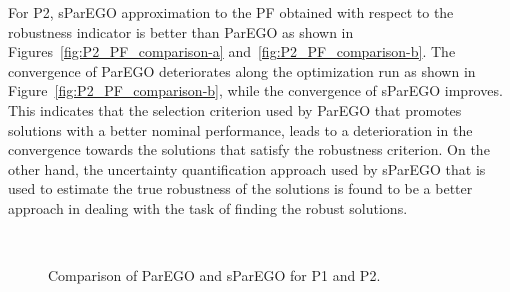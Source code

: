 \documentclass{llncs}
\begin{document}
For P2, sParEGO approximation to the PF obtained with respect to the robustness indicator is better than ParEGO as shown in Figures~\ref{fig:P2_PF_comparison-a} and~\ref{fig:P2_PF_comparison-b}. The convergence of ParEGO deteriorates along the optimization run as shown in Figure~\ref{fig:P2_PF_comparison-b}, while the convergence of sParEGO improves. This indicates that the selection criterion used by ParEGO that promotes solutions with a better nominal performance, leads to a deterioration in the convergence towards the solutions that satisfy the robustness criterion. On the other hand, the uncertainty quantification approach used by sParEGO that is used to estimate the true robustness of the solutions is found to be a better approach in dealing with the task of finding the robust solutions.

\begin{figure}
\centering
{}
\hspace{1cm}
\\
\hspace{1cm}
\caption{Comparison of ParEGO and sParEGO for P1 and P2.}
\label{fig:algorithms_comparison}
\end{figure}
\end{document}
